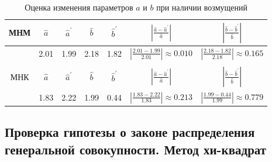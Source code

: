 \documentclass[main.tex]{subfiles}
\begin{document}
\FloatBarrier
\begin{table}
	\centering
	\begin{tabular}{| c | c | c | c | c | c | c |}

		\hline
		МНМ & $\hat{a}$ &  $\hat{a}^{\prime}$ & $\hat{b}$ & $\hat{b}^{\prime}$ &  $|\frac{\hat{a} - \hat{a}^{\prime}}{\hat{a}}|$ & $|\frac{\hat{b} - \hat{b}^{\prime}}{\hat{b}}|$ \\ \hline
		& 2.01 & 1.99 & 2.18 & 1.82 & $|\frac{2.01 - 1.99}{2.01}| \approx 0.010$  & $|\frac{2.18 - 1.82}{2.18}| \approx 0.165$ \\ \hline
		&  &  &  & & &  \\ \hline
		МНК & $\hat{a}$ &  $\hat{a}^{\prime}$ & $\hat{b}$ & $\hat{b}^{\prime}$ &  $|\frac{\hat{a} - \hat{a}^{\prime}}{\hat{a}}|$ & $|\frac{\hat{b} - \hat{b}^{\prime}}{\hat{b}}|$ \\ \hline
		& 1.83 & 2.22 & 1.99 & 0.44 & $|\frac{1.83 - 2.22}{1.83}| \approx 0.213$  & $|\frac{1.99 - 0.44}{1.99}| \approx 0.779$  \\ \hline

	\end{tabular}
	\caption{Оценка изменения параметров $a$ и $b$ при наличии возмущений}
	\label{tab:relative_deviation}
\end{table}


\FloatBarrier
\subsection{Проверка гипотезы о законе распределения генеральной совокупности. Метод хи-квадрат}
\end{document}
